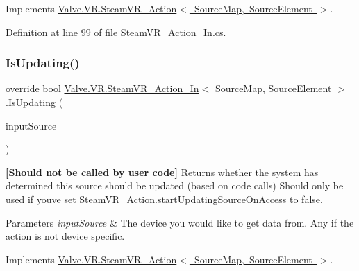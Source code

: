 Implements \mbox{\hyperlink{class_valve_1_1_v_r_1_1_steam_v_r___action_ac8b7caef88740be5ec2ff78fd8fcbfad}{Valve.\+V\+R.\+Steam\+V\+R\+\_\+\+Action$<$ Source\+Map, Source\+Element $>$}}.



Definition at line 99 of file Steam\+V\+R\+\_\+\+Action\+\_\+\+In.\+cs.

\mbox{\label{class_valve_1_1_v_r_1_1_steam_v_r___action___in_a648d3f94c79e2ec43ec9846535fbf8ef}} 
\subsubsection{\texorpdfstring{IsUpdating()}{IsUpdating()}}
{\footnotesize\ttfamily override bool \mbox{\hyperlink{class_valve_1_1_v_r_1_1_steam_v_r___action___in}{Valve.\+V\+R.\+Steam\+V\+R\+\_\+\+Action\+\_\+\+In}}$<$ Source\+Map, Source\+Element $>$.Is\+Updating (\begin{DoxyParamCaption}\item[{\mbox{\hyperlink{namespace_valve_1_1_v_r_a82e5bf501cc3aa155444ee3f0662853f}{Steam\+V\+R\+\_\+\+Input\+\_\+\+Sources}}}]{input\+Source }\end{DoxyParamCaption})\hspace{0.3cm}{\ttfamily [virtual]}}



{\bfseries{\mbox{[}Should not be called by user code\mbox{]}}} Returns whether the system has determined this source should be updated (based on code calls) Should only be used if you\textquotesingle{}ve set \mbox{\hyperlink{class_valve_1_1_v_r_1_1_steam_v_r___action_ae27e9858dec18a4307cca7779ed87ad8}{Steam\+V\+R\+\_\+\+Action.\+start\+Updating\+Source\+On\+Access}} to false. 


\begin{DoxyParams}{Parameters}
{\em input\+Source} & The device you would like to get data from. Any if the action is not device specific.\\
\hline
\end{DoxyParams}


Implements \mbox{\hyperlink{class_valve_1_1_v_r_1_1_steam_v_r___action_ade2f7fe24302b71484c25419fd94271d}{Valve.\+V\+R.\+Steam\+V\+R\+\_\+\+Action$<$ Source\+Map, Source\+Element $>$}}.



